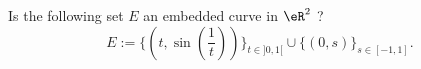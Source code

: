 \begin{exercice}\label{exo001}

Is the following set $E$ an embedded curve in $\eR^2$ ?
\[ 
 E:=\{(t,\sin(\frac{1}{t}))\}_{t\in]0,1[}\cup\{(0,s)\}_{s\in[-1,1]}. 
\]
\end{exercice}
